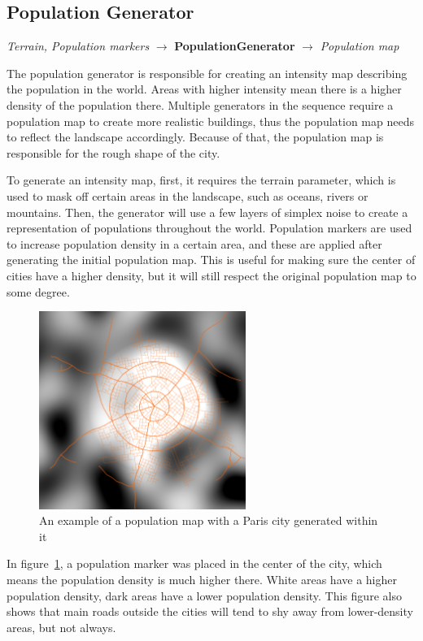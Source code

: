 \subsection{Population Generator}
\begin{center}
    \textit{Terrain, Population markers} $\rightarrow$ \textbf{PopulationGenerator} $\rightarrow$ \textit{Population map} 
\end{center}
The population generator is responsible for creating an intensity map describing the population in the world.
Areas with higher intensity mean there is a higher density of the population there.
Multiple generators in the sequence require a population map to create more realistic buildings, thus the population map needs to reflect the landscape accordingly.
Because of that, the population map is responsible for the rough shape of the city.

To generate an intensity map, first, it requires the terrain parameter, which is used to mask off certain areas in the landscape, such as oceans, rivers or mountains.
Then, the generator will use a few layers of simplex noise to create a representation of populations throughout the world.
Population markers are used to increase population density in a certain area, and these are applied after generating the initial population map.
This is useful for making sure the center of cities have a higher density, but it will still respect the original population map to some degree.

\begin{figure}[h]
  \centering
  \includegraphics[width=0.6\textwidth]{figure/gen_population_map.png}
  \caption{An example of a population map with a Paris city generated within it}
  \label{fig:gen_population_map_example}
\end{figure}

In figure~\ref{fig:gen_population_map_example}, a population marker was placed in the center of the city, which means the population density is much higher there.
White areas have a higher population density, dark areas have a lower population density.
This figure also shows that main roads outside the cities will tend to shy away from lower-density areas, but not always.
